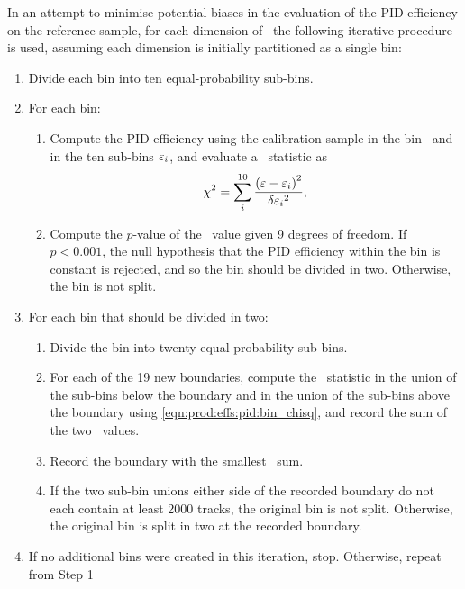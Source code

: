 In an attempt to minimise potential biases in the evaluation of the \ac{PID} 
efficiency on the reference sample, for each dimension of \ptotetanspd\ the 
following iterative procedure is used, assuming each dimension is initially 
partitioned as a single bin:
\begin{enumerate}
  \item Divide each bin into ten equal-probability sub-bins.
  \item For each bin:
    \begin{enumerate}
      \item Compute the \ac{PID} efficiency using the calibration sample in the 
        bin \eff\ and in the ten sub-bins $\varepsilon_{i}$, and evaluate a \chisq\ 
        statistic as
        \begin{equation}
          \chi^2 = \sum_{i}^{10} \frac{{(\varepsilon - \varepsilon_{i})}^{2}}{\delta{\ensuremath{\varepsilon}_{i}}^{2}},
          \label{eqn:prod:effs:pid:bin_chisq}
        \end{equation}
      \item Compute the $p$-value of the \chisq\ value given 9 degrees of 
        freedom. If $p < 0.001$, the null hypothesis that the \ac{PID} 
        efficiency within the bin is constant is rejected, and so the bin 
        should be divided in two. Otherwise, the bin is not split.
    \end{enumerate}
  \item For each bin that should be divided in two:
    \begin{enumerate}
      \item Divide the bin into twenty equal probability sub-bins.
      \item For each of the 19 new boundaries, compute the \chisq\ statistic in 
        the union of the sub-bins below the boundary and in the union of the 
        sub-bins above the boundary using \cref{eqn:prod:effs:pid:bin_chisq}, 
        and record the sum of the two \chisq\ values.
      \item Record the boundary with the smallest \chisq\ sum.
      \item If the two sub-bin unions either side of the recorded boundary do 
        not each contain at least 2000 tracks, the original bin is not split.
        Otherwise, the original bin is split in two at the recorded boundary.
    \end{enumerate}
  \item If no additional bins were created in this iteration, stop.  Otherwise, 
    repeat from Step 1
\end{enumerate}
